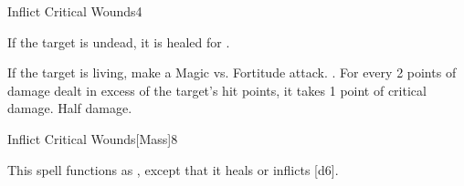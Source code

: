 \begin{spellsection}{Inflict Critical Wounds}{4}
\begin{spellheader}
\end{spellheader}
\begin{spellcontent}
    \begin{spelltargetinginfo}
    \end{spelltargetinginfo}
    \begin{spelleffects}
        \spelleffect If the target is undead, it is healed for .
        \begin{spellattacktriggered}{If the target is living, make a Magic vs. Fortitude attack.}
            \spellsuccess {}. For every 2 points of damage dealt in excess of the target's hit points, it takes 1 point of critical damage.
            \spellfailure Half damage.
        \end{spellattacktriggered}
    \end{spelleffects}
\end{spellcontent}
\begin{spellfooter}
\end{spellfooter}
\end{spellsection}

\begin{spellsection}{Inflict Critical Wounds}[Mass]{8}
\begin{spellheader}
\end{spellheader}
\begin{spellcontent}
    \begin{spelltargetinginfo}
    \end{spelltargetinginfo}
    \begin{spelleffects}
        \spellspecial This spell functions as , except that it heals or inflicts [d6].
    \end{spelleffects}
\end{spellcontent}
\begin{spellfooter}
\end{spellfooter}
\end{spellsection}

